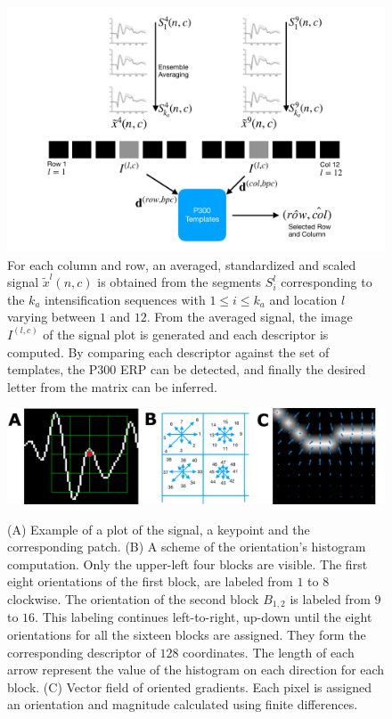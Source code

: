 \documentclass[utf8]{frontiersSCNS} %
\begin{document}
\begin{figure}[h!]
\centering
\includegraphics[width=15cm]{classificationgraph.pdf}
\caption{For each column and row, an averaged, standardized and scaled signal $\tilde{x}^l(n,c)$ is obtained from the segments $S_i^l$  corresponding to the $k_a$ intensification sequences with $ 1 \leq i \leq k_a $ and location $l$ varying between $1$ and $12$. From the averaged signal, the image $I^{(l,c)}$ of the signal plot is generated and each descriptor is computed.  By comparing each descriptor against the set of templates, the P300 ERP can be detected, and finally the desired letter from the matrix can be inferred.}
\label{fig:classification}
\end{figure}

\begin{figure}[h!]
\centering
\includegraphics[width=16cm]{gradients.png}\label{samplegradients}
\caption{ (A) Example of a plot of the signal, a keypoint and the corresponding patch. (B) A scheme of the orientation's histogram computation.  Only the upper-left four blocks are visible.  The first eight orientations of the first block, are labeled from $1$ to $8$ clockwise. The orientation of the second block $ B_{1,2} $ is labeled from $9$ to $16$.  This labeling continues left-to-right, up-down until the eight orientations for all the sixteen blocks are assigned. They form the corresponding descriptor of $128$ coordinates.  The length of each arrow represent the value of the histogram on each direction for each block. (C) Vector field of oriented gradients.  Each pixel is assigned an orientation and magnitude calculated  using finite differences. }
\label{fig:sampledescriptor}
\end{figure}
\end{document}
